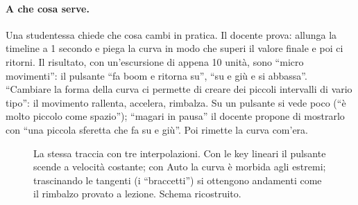 \paragraph{A che cosa serve.} Una studentessa chiede che cosa cambi in pratica. Il
docente prova: allunga la timeline a 1 secondo e piega la curva in modo che superi il
valore finale e poi ci ritorni. Il risultato, con un'escursione di appena 10 unità, sono
``micro movimenti'': il pulsante ``fa boom e ritorna su'', ``su e giù e si abbassa''.
``Cambiare la forma della curva ci permette di creare dei piccoli intervalli di vario
tipo'': il movimento rallenta, accelera, rimbalza. Su un pulsante si vede poco (``è molto
piccolo come spazio''); ``magari in pausa'' il docente propone di mostrarlo con ``una
piccola sferetta che fa su e giù''. Poi rimette la curva com'era.

\begin{figure}[htbp]
\centering
{}
\caption{La stessa traccia con tre interpolazioni. Con le key lineari il pulsante scende
a velocità costante; con Auto la curva è morbida agli estremi; trascinando le tangenti
(i ``braccetti'') si ottengono andamenti come il rimbalzo provato a lezione. Schema
ricostruito.}
\label{ue7:fig:curve}
\end{figure}

